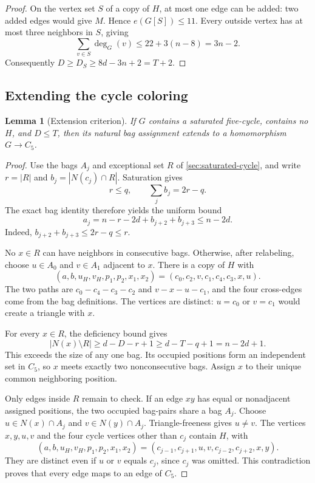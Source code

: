 \documentclass[11pt]{article}
\newtheorem{lemma}[theorem]{Lemma}
\theoremstyle{definition}
\theoremstyle{remark}
\newcommand{\N}{N}
\begin{document}
\begin{proof}
On the vertex set $S$ of a copy of $H$, at most one edge can be added:
two added edges would give $M$. Hence $e(G[S])\le11$. Every outside
vertex has at most three neighbors in $S$, giving
\[
  \sum_{v\in S}\deg_G(v)\le22+3(n-8)=3n-2.
\]
Consequently $D\ge D_S\ge8d-3n+2=T+2$.
\end{proof}

\subsection{Extending the cycle coloring}

\begin{lemma}[Extension criterion]\label{lem:extension}
If $G$ contains a saturated five-cycle, contains no $H$, and $D\le T$,
then its natural bag assignment extends to a homomorphism $G\to C_5$.
\end{lemma}

\begin{proof}
Use the bags $A_j$ and exceptional set $R$ of
\cref{sec:saturated-cycle}, and write $r=|R|$ and
$b_j=|\N(c_j)\cap R|$. Saturation gives
\[
  r\le q,\qquad \sum_jb_j=2r-q.
\]
The exact bag identity therefore yields the uniform bound
\begin{equation}\label{eq:hard-bag-size}
  a_j=n-r-2d+b_{j+2}+b_{j+3}\le n-2d.
\end{equation}
Indeed, $b_{j+2}+b_{j+3}\le2r-q\le r$.

No $x\in R$ can have neighbors in consecutive bags. Otherwise, after
relabeling, choose $u\in A_0$ and $v\in A_1$ adjacent to $x$. There is a
copy of $H$ with
\[
  (a,b,u_H,v_H,p_1,p_2,x_1,x_2)
  =(c_0,c_2,v,c_1,c_4,c_3,x,u).
\]
The two paths are $c_0-c_4-c_3-c_2$ and $v-x-u-c_1$, and the four cross-edges
come from the bag definitions. The vertices are distinct: $u=c_0$ or
$v=c_1$ would create a triangle with $x$.

For every $x\in R$, the deficiency bound gives
\begin{equation}\label{eq:R-neighbors}
  |\N(x)\setminus R|
  \ge d-D-r+1
  \ge d-T-q+1=n-2d+1.
\end{equation}
This exceeds the size of any one bag. Its occupied positions form an
independent set in $C_5$, so $x$ meets exactly two nonconsecutive bags.
Assign $x$ to their unique common neighboring position.

Only edges inside $R$ remain to check. If an edge $xy$ has equal or
nonadjacent assigned positions, the two occupied bag-pairs share a bag
$A_j$. Choose $u\in\N(x)\cap A_j$ and $v\in\N(y)\cap A_j$.
Triangle-freeness gives $u\ne v$. The vertices $x,y,u,v$ and the four cycle
vertices other than $c_j$ contain $H$, with
\[
  (a,b,u_H,v_H,p_1,p_2,x_1,x_2)
  =(c_{j-1},c_{j+1},u,v,c_{j-2},c_{j+2},x,y).
\]
They are distinct even if $u$ or $v$ equals $c_j$, since $c_j$ was omitted.
This contradiction proves that every edge maps to an edge of $C_5$.
\end{proof}
\end{document}
